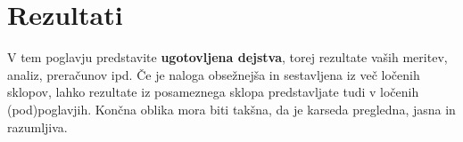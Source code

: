 \chapter{Rezultati}\label{cha:rezultati}

V tem poglavju predstavite \textbf{ugotovljena dejstva}, torej rezultate vaših meritev, analiz, preračunov ipd. Če je naloga obsežnejša in sestavljena iz več ločenih sklopov, lahko rezultate iz posameznega sklopa predstavljate tudi v ločenih (pod)poglavjih. Končna oblika mora biti takšna, da je karseda pregledna, jasna in razumljiva.